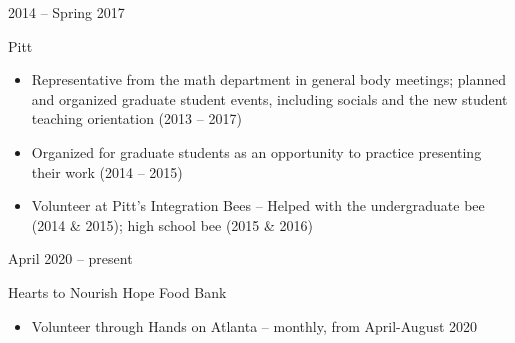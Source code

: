 \documentclass[a4paper,10pt]{article}
\newlength{\cvcolumngapwidth}
\newlength{\cvleftcolumnwidth}
\newlength{\cvrightcolumnwidth}
\newcommand{\cvtitlestyle}[1]{{\large\cvtitlefont\textcolor{cvtitlecolor}{#1}}}
\newcommand{\cvheadingstyle}[1]{{\normalsize\cvheadingfont\textcolor{cvheadingcolor}{#1}}}
\newlength{\cvafteritemskipamount}
\newlength{\cvaftertitleskipamount}
\newlength{\cvparskip}
\newcommand{\cvitem}[2]{
            \begin{minipage}[t]{\cvleftcolumnwidth}
                \raggedleft #1
            \end{minipage}%
            \hspace{\cvcolumngapwidth}%
            \begin{minipage}[t]{\cvrightcolumnwidth}
                \setlength{\parskip}{\cvparskip} #2
            \end{minipage}
        
            \vspace{\cvafteritemskipamount}
        }
\newcommand{\cvtitle}[1]{
            \cvtitlestyle{#1}
        
            \vspace{\cvaftertitleskipamount}
            \vspace{-\cvparskip}
        }
\begin{document}
        
            
        \cvitem{
            \cvheadingstyle{2014 -- Spring 2017}
        }{
            \cvtitle{Pitt}
        
            \begin{itemize}[leftmargin=*]
    	\item Representative from the math department in general body meetings; planned and organized graduate student events, including socials and the new student teaching orientation (2013 -- 2017)
    	\item Organized for graduate students as an opportunity to practice presenting their work (2014 -- 2015)
    	\item Volunteer at Pitt's Integration Bees -- Helped with the undergraduate bee (2014 \& 2015); high school bee (2015 \& 2016)
        
            \end{itemize}
        
        }
        
%        
        
        
          \cvitem{
            \cvheadingstyle{April 2020 -- present}
        }{
            \cvtitle{Hearts to Nourish Hope Food Bank}
        
            \begin{itemize}[leftmargin=*]
            	\item  Volunteer through Hands on Atlanta -- monthly, from April-August 2020
        
            \end{itemize}
        
        }
        
\end{document}
